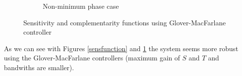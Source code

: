 \begin{figure}[h!t]
\begin{subfigure}[b]{0.45\columnwidth}
                \caption{Non-minimum phase case}
        \end{subfigure}
        \caption{Sensitivity and complementarity functions using Glover-MacFarlane controller}
        \label{sensfunctionglover}
\end{figure}

As we can see with Figures \ref{sensfunction} and \ref{sensfunctionglover} the system seems more robust using the Glover-MacFarlane controllers (maximum gain of $S$ and $T$ and bandwiths are smaller).
